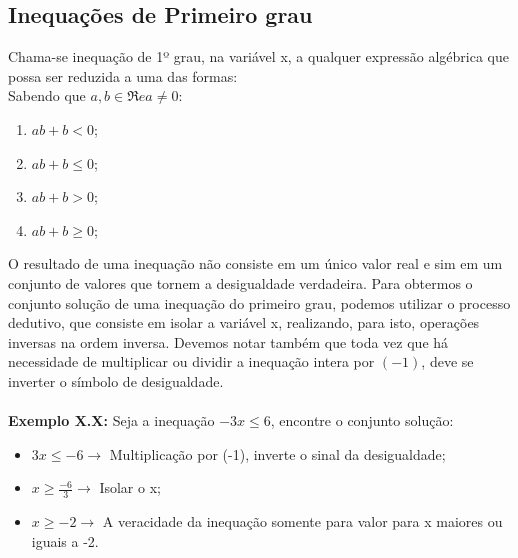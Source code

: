 \documentclass[a4paper,12pt,twoside,BCOR=10mm]{scrbook}
\begin{document}
\begin{titlepage}
\section{Inequações de Primeiro grau}
Chama-se inequação de 1º grau, na variável x, a qualquer expressão algébrica que possa ser reduzida a uma das formas:
\\
Sabendo que $a,b \in \Re e a \neq 0$:
\begin{enumerate}
\item $ab + b < 0$;
\item $ab + b \leq 0$;
\item $ab + b > 0$;
\item $ab + b \geq 0$;
\end{enumerate}
O resultado de uma inequação não consiste em um único valor real e sim em um conjunto de valores que tornem a desigualdade verdadeira. Para obtermos o conjunto solução de uma inequação do primeiro grau, podemos utilizar o processo dedutivo, que consiste em isolar a variável x, realizando, para isto, operações inversas na ordem inversa. Devemos notar também que toda vez que há necessidade de multiplicar ou dividir a inequação intera por $(-1)$, deve se inverter o símbolo de desigualdade.
\\
\\
\textbf{Exemplo X.X:} Seja a inequação $-3x \leq 6$, encontre o conjunto solução: 
\\
\begin{itemize}
	\item $3x \leq -6 \rightarrow$ Multiplicação por (-1), inverte o sinal da desigualdade;\\
	\item $x \geq \frac{-6}{3} \rightarrow$ Isolar o x;\\
	\item $x \geq -2 \rightarrow$ A veracidade da inequação somente para valor para x maiores ou iguais a -2.\\
	

\end{itemize}
\end{titlepage}
\end{document}
